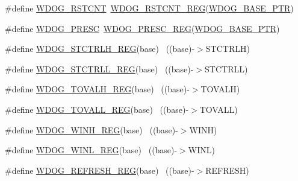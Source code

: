 \begin{DoxyCompactItemize}
\item 
\#define \hyperlink{group___w_d_o_g___register___accessor___macros_gae3600ebbeca42091142fe17f7f2eab6a}{W\+D\+O\+G\+\_\+\+R\+S\+T\+C\+NT}~\hyperlink{group___w_d_o_g___register___accessor___macros_ga321d566d296ee323809e242077a1c776}{W\+D\+O\+G\+\_\+\+R\+S\+T\+C\+N\+T\+\_\+\+R\+EG}(\hyperlink{group___w_d_o_g___peripheral_ga72fb27c7bc1ae124f180d8f2c7b9fa79}{W\+D\+O\+G\+\_\+\+B\+A\+S\+E\+\_\+\+P\+TR})
\item 
\#define \hyperlink{group___w_d_o_g___register___accessor___macros_gac927e6dd73774cbbb57d36bbe3351925}{W\+D\+O\+G\+\_\+\+P\+R\+E\+SC}~\hyperlink{group___w_d_o_g___register___accessor___macros_gacbfa99926928928f05da2e4c752ea945}{W\+D\+O\+G\+\_\+\+P\+R\+E\+S\+C\+\_\+\+R\+EG}(\hyperlink{group___w_d_o_g___peripheral_ga72fb27c7bc1ae124f180d8f2c7b9fa79}{W\+D\+O\+G\+\_\+\+B\+A\+S\+E\+\_\+\+P\+TR})
\item 
\#define \hyperlink{group___w_d_o_g___register___accessor___macros_gafe3961a26965f4d22fa82eb4a6906efa}{W\+D\+O\+G\+\_\+\+S\+T\+C\+T\+R\+L\+H\+\_\+\+R\+EG}(base)                                  ~((base)-\/$>$S\+T\+C\+T\+R\+LH)
\item 
\#define \hyperlink{group___w_d_o_g___register___accessor___macros_gab5f636177e7295761f4d366fc6f2d9c5}{W\+D\+O\+G\+\_\+\+S\+T\+C\+T\+R\+L\+L\+\_\+\+R\+EG}(base)                                  ~((base)-\/$>$S\+T\+C\+T\+R\+LL)
\item 
\#define \hyperlink{group___w_d_o_g___register___accessor___macros_gaa18bf2a6abf1641d711ee0a8e963d704}{W\+D\+O\+G\+\_\+\+T\+O\+V\+A\+L\+H\+\_\+\+R\+EG}(base)                                    ~((base)-\/$>$T\+O\+V\+A\+LH)
\item 
\#define \hyperlink{group___w_d_o_g___register___accessor___macros_gaf4ebf9d6344af3fa4c4cf0219a334dac}{W\+D\+O\+G\+\_\+\+T\+O\+V\+A\+L\+L\+\_\+\+R\+EG}(base)                                    ~((base)-\/$>$T\+O\+V\+A\+LL)
\item 
\#define \hyperlink{group___w_d_o_g___register___accessor___macros_gacb494604d8f57ea1aa0a6d8c9921b955}{W\+D\+O\+G\+\_\+\+W\+I\+N\+H\+\_\+\+R\+EG}(base)                                        ~((base)-\/$>$W\+I\+NH)
\item 
\#define \hyperlink{group___w_d_o_g___register___accessor___macros_ga7d3de8371302abe17948011dd6ae8522}{W\+D\+O\+G\+\_\+\+W\+I\+N\+L\+\_\+\+R\+EG}(base)                                        ~((base)-\/$>$W\+I\+NL)
\item 
\#define \hyperlink{group___w_d_o_g___register___accessor___macros_ga706e227590678130bb2b7fc04e0263d1}{W\+D\+O\+G\+\_\+\+R\+E\+F\+R\+E\+S\+H\+\_\+\+R\+EG}(base)                                  ~((base)-\/$>$R\+E\+F\+R\+E\+SH)

\end{DoxyCompactItemize}
